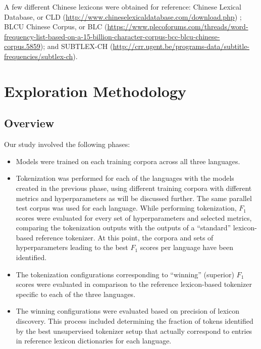 \documentclass[11pt]{article}
\begin{document}
A few different Chinese lexicons were obtained for reference: Chinese Lexical Database, or CLD (\url{http://www.chineselexicaldatabase.com/download.php}) \citep[see][]{16};  BLCU Chinese Corpus, or BLC (\url{https://www.plecoforums.com/threads/word-frequency-list-based-on-a-15-billion-character-corpus-bcc-blcu-chinese-corpus.5859}); and SUBTLEX-CH (\url{http://crr.ugent.be/programs-data/subtitle-frequencies/subtlex-ch}).

\section{Exploration Methodology}

\subsection{Overview}

Our study involved the following phases:

\begin{itemize}

\item Models were trained on each training corpora across all three languages.

\item Tokenization was performed for each of the languages with the models created in the previous phase, using different training corpora with different metrics and hyperparameters as will be discussed further. The same parallel test corpus was used for each language. While performing tokenization, $F_1$ scores were evaluated for every set of hyperparameters and selected metrics, comparing the tokenization outputs with the outputs of a “standard” lexicon-based reference tokenizer. At this point, the corpora and sets of hyperparameters leading to the best $F_1$ scores per language have been identified.

\item The tokenization configurations corresponding to “winning” (superior) $F_1$ scores were evaluated in comparison to the reference lexicon-based tokenizer specific to each of the three languages.

\item The winning configurations were evaluated based on precision of lexicon discovery. This process included determining the fraction of tokens identified by the best unsupervised tokenizer setup that actually correspond to entries in reference lexicon dictionaries for each language.

\end{itemize}
\end{document}
